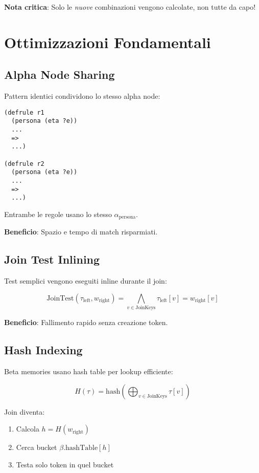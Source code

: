 \textbf{Nota critica}: Solo le \textit{nuove} combinazioni vengono calcolate, non tutte da capo!

\section{Ottimizzazioni Fondamentali}

\subsection{Alpha Node Sharing}

Pattern identici condividono lo stesso alpha node:

\begin{lstlisting}[language=CLIPS]
(defrule r1
  (persona (eta ?e))
  ...
  =>
  ...)

(defrule r2
  (persona (eta ?e))
  ...
  =>
  ...)
\end{lstlisting}

Entrambe le regole usano lo stesso $\alpha_{\text{persona}}$.

\textbf{Beneficio}: Spazio e tempo di match risparmiati.

\subsection{Join Test Inlining}

Test semplici vengono eseguiti inline durante il join:

\begin{equation}
\text{JoinTest}(\tau_{\text{left}}, w_{\text{right}}) = \bigwedge_{v \in \text{JoinKeys}} \tau_{\text{left}}[v] = w_{\text{right}}[v]
\end{equation}

\textbf{Beneficio}: Fallimento rapido senza creazione token.

\subsection{Hash Indexing}

Beta memories usano hash table per lookup efficiente:

\begin{equation}
H(\tau) = \text{hash}\left(\bigoplus_{v \in \text{JoinKeys}} \tau[v]\right)
\end{equation}

Join diventa:
\begin{enumerate}
\item Calcola $h = H(w_{\text{right}})$
\item Cerca bucket $\beta.\text{hashTable}[h]$
\item Testa solo token in quel bucket
\end{enumerate}


